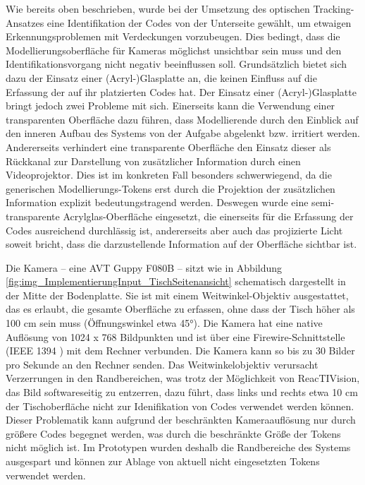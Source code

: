 Wie bereits oben beschrieben, wurde bei der Umsetzung des optischen Tracking-Ansatzes eine Identifikation der Codes von der Unterseite gewählt, um etwaigen Erkennungsproblemen mit Verdeckungen vorzubeugen. Dies bedingt, dass die Modellierungsoberfläche für Kameras möglichst unsichtbar sein muss und den Identifikationsvorgang nicht negativ beeinflussen soll. Grundsätzlich bietet sich dazu der Einsatz einer (Acryl-)Glasplatte an, die keinen Einfluss auf die Erfassung der auf ihr platzierten Codes hat. Der Einsatz einer (Acryl-)Glasplatte bringt jedoch zwei Probleme mit sich. Einerseits kann die Verwendung einer transparenten Oberfläche dazu führen, dass Modellierende durch den Einblick auf den inneren Aufbau des Systems von der Aufgabe abgelenkt bzw. irritiert werden. Andererseits verhindert eine transparente Oberfläche den Einsatz dieser als Rückkanal zur Darstellung von zusätzlicher Information durch einen Videoprojektor. Dies ist im konkreten Fall besonders schwerwiegend, da die generischen Modellierungs-Tokens erst durch die Projektion der zusätzlichen Information explizit bedeutungstragend werden. Deswegen wurde eine semi-transparente Acrylglas-Oberfläche eingesetzt, die einerseits für die Erfassung der Codes ausreichend durchlässig ist, andererseits aber auch das projizierte Licht soweit bricht, dass die darzustellende Information auf der Oberfläche sichtbar ist.

Die Kamera -- eine AVT Guppy F080B \citep{AVT08}  -- sitzt wie in Abbildung \ref{fig:img_ImplementierungInput_TischSeitenansicht} schematisch dargestellt in der Mitte der Bodenplatte. Sie ist mit einem Weitwinkel-Objektiv ausgestattet, das es erlaubt, die gesamte Oberfläche zu erfassen, ohne dass der Tisch höher als 100 cm sein muss (Öffnungswinkel etwa 45°). Die Kamera hat eine native Auflösung von 1024 x 768 Bildpunkten und ist über eine Firewire-Schnittstelle (IEEE 1394 \citep{Bloks96}) mit dem Rechner verbunden. Die Kamera kann so bis zu 30 Bilder pro Sekunde an den Rechner senden. Das Weitwinkelobjektiv verursacht Verzerrungen in den Randbereichen, was trotz der Möglichkeit von ReacTIVision, das Bild softwareseitig zu entzerren, dazu führt, dass links und rechts etwa 10 cm der Tischoberfläche nicht zur Idenifikation von Codes verwendet werden können. Dieser Problematik kann aufgrund der beschränkten Kameraauflösung nur durch größere Codes begegnet werden, was durch die beschränkte Größe der Tokens nicht möglich ist. Im Prototypen wurden deshalb die Randbereiche des Systems ausgespart und können zur Ablage von aktuell nicht eingesetzten Tokens verwendet werden. 


